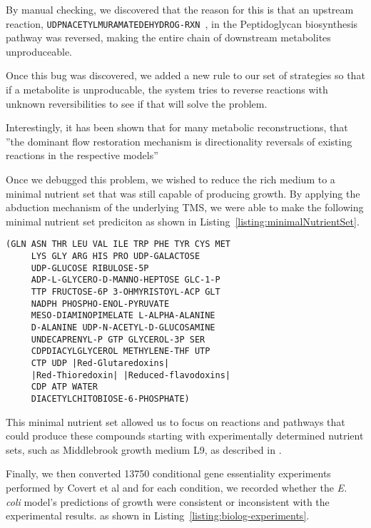 By manual checking, we discovered that the reason for this is that an upstream reaction, {\tt UDPNACETYLMURAMATEDEHYDROG-RXN }, in the Peptidoglycan biosynthesis pathway was reversed, making the entire chain of downstream metabolites unproduceable. 

Once this bug was discovered,  we added a new rule to our set of strategies so that
 if a metabolite is unproducable, the system tries to reverse
reactions with unknown reversibilities to see if that will
solve the problem.  

Interestingly, it has been shown that for many metabolic reconstructions,
that ''the dominant flow restoration mechanism is directionality
reversals of existing reactions in the respective
models''\cite{kumar2007}

Once we debugged this problem, we wished to reduce the rich medium to a minimal nutrient set that was still
capable of producing growth. By applying the abduction mechanism of the underlying TMS, we were able to make the following
minimal nutrient set prediciton as shown in Listing~\ref{listing:minimalNutrientSet}.
\begin{lstlisting}[label={listing:minimalNutrientSet},caption={{\em E. coli} predicted minimal nutrient set}]
(GLN ASN THR LEU VAL ILE TRP PHE TYR CYS MET 
     LYS GLY ARG HIS PRO UDP-GALACTOSE 
     UDP-GLUCOSE RIBULOSE-5P 
     ADP-L-GLYCERO-D-MANNO-HEPTOSE GLC-1-P 
     TTP FRUCTOSE-6P 3-OHMYRISTOYL-ACP GLT 
     NADPH PHOSPHO-ENOL-PYRUVATE 
     MESO-DIAMINOPIMELATE L-ALPHA-ALANINE 
     D-ALANINE UDP-N-ACETYL-D-GLUCOSAMINE 
     UNDECAPRENYL-P GTP GLYCEROL-3P SER
     CDPDIACYLGLYCEROL METHYLENE-THF UTP 
     CTP UDP |Red-Glutaredoxins|
     |Red-Thioredoxin| |Reduced-flavodoxins| 
     CDP ATP WATER
     DIACETYLCHITOBIOSE-6-PHOSPHATE)
\end{lstlisting}
This minimal nutrient set allowed us to focus on reactions and pathways that could produce these compounds starting
with experimentally determined nutrient sets, such as Middlebrook growth medium L9, as described in \cite{joyce2006}.


Finally, we then converted 13750 conditional gene essentiality experiments performed by
Covert et al\cite{covert2004} and for each condition, we recorded
whether the {\em E. coli} model's predictions of growth were
consistent or inconsistent with the experimental results. as shown in Listing~\ref{listing:biolog-experiments}.

